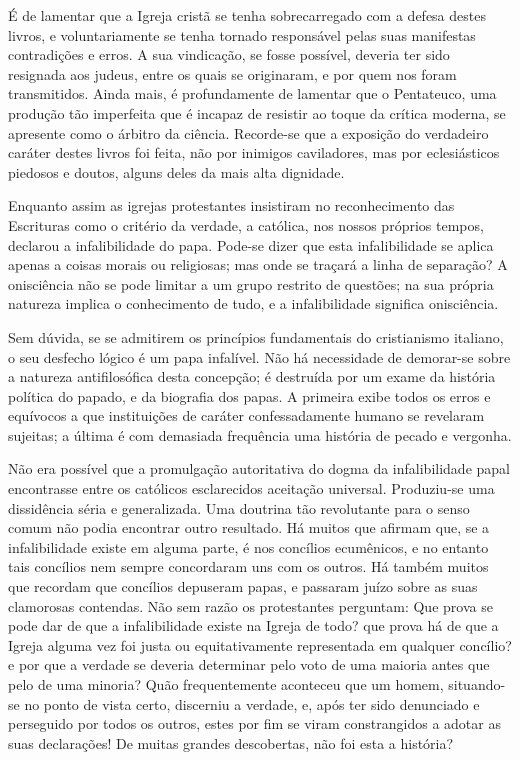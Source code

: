 \documentclass[11pt,a5paper,twoside,openany]{book}
\begin{document}
É de lamentar que a Igreja cristã se tenha sobrecarregado com a defesa destes livros, e voluntariamente se tenha tornado responsável pelas suas manifestas contradições e erros. A sua vindicação, se fosse possível, deveria ter sido resignada aos judeus, entre os quais se originaram, e por quem nos foram transmitidos. Ainda mais, é profundamente de lamentar que o Pentateuco, uma produção tão imperfeita que é incapaz de resistir ao toque da crítica moderna, se apresente como o árbitro da ciência. Recorde-se que a exposição do verdadeiro caráter destes livros foi feita, não por inimigos caviladores, mas por eclesiásticos piedosos e doutos, alguns deles da mais alta dignidade.

Enquanto assim as igrejas protestantes insistiram no reconhecimento das Escrituras como o critério da verdade, a católica, nos nossos próprios tempos, declarou a infalibilidade do papa. Pode-se dizer que esta infalibilidade se aplica apenas a coisas morais ou religiosas; mas onde se traçará a linha de separação? A onisciência não se pode limitar a um grupo restrito de questões; na sua própria natureza implica o conhecimento de tudo, e a infalibilidade significa onisciência.

Sem dúvida, se se admitirem os princípios fundamentais do cristianismo italiano, o seu desfecho lógico é um papa infalível. Não há necessidade de demorar-se sobre a natureza antifilosófica desta concepção; é destruída por um exame da história política do papado, e da biografia dos papas. A primeira exibe todos os erros e equívocos a que instituições de caráter confessadamente humano se revelaram sujeitas; a última é com demasiada frequência uma história de pecado e vergonha.

Não era possível que a promulgação autoritativa do dogma da infalibilidade papal encontrasse entre os católicos esclarecidos aceitação universal. Produziu-se uma dissidência séria e generalizada. Uma doutrina tão revolutante para o senso comum não podia encontrar outro resultado. Há muitos que afirmam que, se a infalibilidade existe em alguma parte, é nos concílios ecumênicos, e no entanto tais concílios nem sempre concordaram uns com os outros. Há também muitos que recordam que concílios depuseram papas, e passaram juízo sobre as suas clamorosas contendas. Não sem razão os protestantes perguntam: Que prova se pode dar de que a infalibilidade existe na Igreja de todo? que prova há de que a Igreja alguma vez foi justa ou equitativamente representada em qualquer concílio? e por que a verdade se deveria determinar pelo voto de uma maioria antes que pelo de uma minoria? Quão frequentemente aconteceu que um homem, situando-se no ponto de vista certo, discerniu a verdade, e, após ter sido denunciado e perseguido por todos os outros, estes por fim se viram constrangidos a adotar as suas declarações! De muitas grandes descobertas, não foi esta a história?
\end{document}
